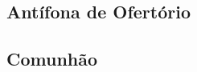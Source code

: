\subsection{Antífona de Ofertório}\label{subsection:tempus-nativitatis/in-nativitatis-domini/offertorium}

\AllowPageFlush

\subsection{Comunhão}\label{subsection:tempus-nativitatis/in-nativitatis-domini/communio}

\AllowPageFlush